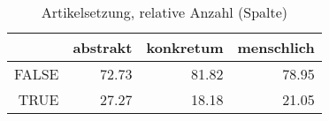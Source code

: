 \begin{table}[ht]
\centering
\begin{tabular}{rrrr}
  \hline
 & abstrakt & konkretum & menschlich \\ 
  \hline
FALSE & 72.73 & 81.82 & 78.95 \\ 
  TRUE & 27.27 & 18.18 & 21.05 \\ 
   \hline
\end{tabular}
\caption{Artikelsetzung, relative Anzahl (Spalte)} 
\end{table}
